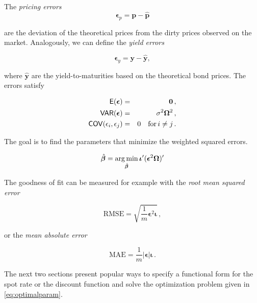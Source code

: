 The \emph{pricing errors}
\begin{equation*}
  \label{eq:pricingerrors}
  \bm{\epsilon}_p = \bm{p-\hat{p}}
\end{equation*}

are the deviation of the theoretical prices from the dirty prices observed on the market. Analogously, we can define the \emph{yield errors}


\begin{equation*}
  \label{eq:yielderrors}
  \bm{\epsilon}_y = \bm{y-\hat{y}},
\end{equation*}

where $\hat{\bm{y}}$ are the yield-to-maturities based on the theoretical bond prices. The errors satisfy

\begin{eqnarray*}
  \label{eq:residuals}
  \mathsf{E}(\bm{\epsilon}) &=& \bm{0}\,,\\
  \mathsf{VAR}(\bm{\epsilon}) &=&\sigma^2\bm{\Omega}^2\,,\\
  \mathsf{COV}(\epsilon_i, \epsilon_j) &=& 0 \quad \mbox{for}\,i\neq j\, .
\end{eqnarray*}

The goal is to find the parameters that minimize the weighted squared errors.


\begin{equation}
  \label{eq:optimalparam}
  \hat{\bm{\beta}}= \operatorname*{arg\,min}_{\hat{\bm{\beta}}}\bm{\iota}'(\bm{\epsilon}^2\bm{\Omega})'
\end{equation}

The goodness of fit can be measured for example with the \emph{root mean squared error}

\begin{equation*}
  \label{eq:rmse}
  \mbox{RMSE}=\sqrt{\frac{1}{m}\bm{\epsilon}^2\bm{\iota}}\,,
\end{equation*}

or the \emph{mean absolute error}

\begin{equation*}
  \label{eq:mae}
  \mbox{MAE}=\frac{1}{m}|\bm{\epsilon}|\bm{\iota}\,.
\end{equation*}

The next two sections present popular ways to specify a functional form for the spot rate or the discount function and solve the optimization problem given in \eqref{eq:optimalparam}.


